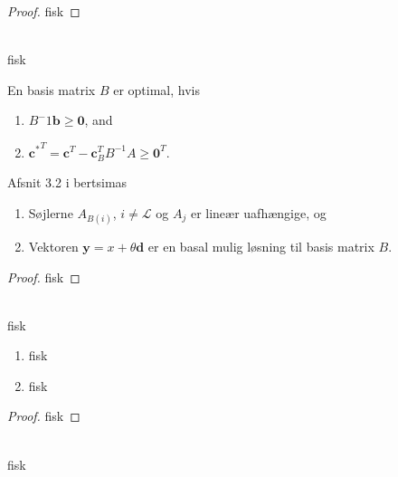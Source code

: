%
\begin{proof}
fisk
\end{proof}
\\
%
fisk
%
%
\begin{defn}{}{}
En basis matrix $B$ er optimal, hvis
\begin{enumerate}[label = (\alph*)]
\item $B^-1 \mathbf{b} \geq \mathbf{0}$, and
\item ${\mathbf{c}^*}^T = \mathbf{c}^T - \mathbf{c}_B^T B^{-1} A \geq \mathbf{0}^T$.
\end{enumerate}
\end{defn}
\noindent
%
%
% 
Afsnit 3.2 i bertsimas
\begin{thm}{}{}
\begin{enumerate}[label = (\alph*)]
\item Søjlerne $A_{B(i)}$, $i \neq \mathcal{L}$ og $A_j$ er lineær uafhængige, og 
\item Vektoren $\mathbf{y}=x+ \theta \mathbf{d}$ er en basal mulig løsning til basis matrix $B$.
\end{enumerate}
\end{thm}
%
\begin{proof}
fisk
\end{proof}
\\
%
fisk
\begin{thm}{}{}
\begin{enumerate}[label = (\alph*)]
\item fisk
\item fisk
\end{enumerate}
\end{thm}
%
\begin{proof}
fisk
\end{proof}
\\
%
fisk